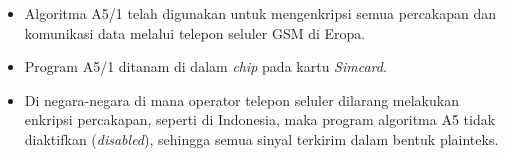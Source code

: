 \documentclass{article}
\begin{document}

\begin{itemize}
    \item Algoritma A5/1 telah digunakan untuk mengenkripsi semua percakapan dan komunikasi data melalui telepon seluler GSM di Eropa.
    \item Program A5/1 ditanam di dalam \textit{chip} pada kartu \textit{Simcard}.
    \item Di negara-negara di mana operator telepon seluler dilarang melakukan enkripsi percakapan, seperti di Indonesia, maka program algoritma A5 tidak diaktifkan (\textit{disabled}), sehingga semua sinyal terkirim dalam bentuk plainteks.
\end{itemize}
\end{document}
